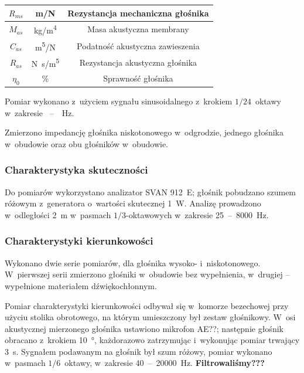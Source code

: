 \documentclass[12pt]{oska}
\newcommand{\range}{~--~}
\begin{document}
\begin{table}[!h]
\begin{tabular}{|c|c|c|}
					$R_{ms}$ & \si[per-mode=symbol]{\metre\per\newton} & Rezystancja mechaniczna głośnika \\\hline
					\hline
					$M_{as}$ & \si[per-mode=symbol]{\kilo\gram\per\metre\tothe{4}} & Masa akustyczna membrany \\\hline
					$C_{as}$ & \si[per-mode=symbol]{\metre\tothe{5}\per\newton} & Podatność akustyczna zawieszenia \\\hline
					$R_{as}$ & \si[per-mode=symbol]{\newton\s\per\metre\tothe{5}} & Rezystancja akustyczna głośnika \\\hline
					\hline
					$\eta_0$ & \% & Sprawność głośnika \\\hline
				\end{tabular}
			\end{table}

			
			Pomiar wykonano z~użyciem sygnału sinusoidalnego z~krokiem $1/24$~oktawy w~zakresie \num{}\range\num{}~\si{\Hz}.
			
			Zmierzono impedancję głośnika niskotonowego w~odgrodzie, jednego głośnika w~obudowie oraz obu głośników w~obudowie.
			
		\subsubsection{Charakterystyka skuteczności}
			
			Do pomiarów wykorzystano analizator SVAN 912~E; głośnik pobudzano szumem różowym z~generatora o~wartości skutecznej \SI{1}{\watt}. Analizę prowadzono w~odległości \SI{2}{\metre} w~pasmach $1/3$-oktawowych w~zakresie \num{25}\range\num{8000}~\si{\Hz}.
			
		\subsubsection{Charakterystyki kierunkowości}
			
			Wykonano dwie serie pomiarów, dla głośnika wysoko- i~niskotonowego. W~pierwszej serii zmierzono głośniki w~obudowie bez wypełnienia, w~drugiej -- wypełnione materiałem dźwiękochłonnym.
			
			Pomiar charakterystyki kierunkowości odbywał się w~komorze bezechowej przy użyciu stolika obrotowego, na którym umieszczony był zestaw głośnikowy. W~osi akustycznej mierzonego głośnika ustawiono mikrofon AE??; następnie głośnik obracano z~krokiem \SI{10}{\degree}, każdorazowo zatrzymując i~wykonując pomiar trwający \SI{3}{\s}. Sygnałem podawanym na głośnik był szum różowy, pomiar wykonano w~pasmach $1/6$~oktawy, w~zakresie \num{40}\range\num{20000}~\si{\Hz}. \color{red} \textbf{Filtrowaliśmy???}\color{black}
\end{document}
